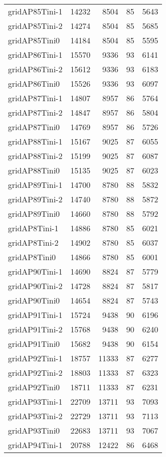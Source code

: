 \begin{longtable}{lrrrr}
gridAP85Tini-1 & 14232 & 8504 & 85 & 5643 \\
gridAP85Tini-2 & 14274 & 8504 & 85 & 5685 \\
gridAP85Tini0 & 14184 & 8504 & 85 & 5595 \\
gridAP86Tini-1 & 15570 & 9336 & 93 & 6141 \\
gridAP86Tini-2 & 15612 & 9336 & 93 & 6183 \\
gridAP86Tini0 & 15526 & 9336 & 93 & 6097 \\
gridAP87Tini-1 & 14807 & 8957 & 86 & 5764 \\
gridAP87Tini-2 & 14847 & 8957 & 86 & 5804 \\
gridAP87Tini0 & 14769 & 8957 & 86 & 5726 \\
gridAP88Tini-1 & 15167 & 9025 & 87 & 6055 \\
gridAP88Tini-2 & 15199 & 9025 & 87 & 6087 \\
gridAP88Tini0 & 15135 & 9025 & 87 & 6023 \\
gridAP89Tini-1 & 14700 & 8780 & 88 & 5832 \\
gridAP89Tini-2 & 14740 & 8780 & 88 & 5872 \\
gridAP89Tini0 & 14660 & 8780 & 88 & 5792 \\
gridAP8Tini-1 & 14886 & 8780 & 85 & 6021 \\
gridAP8Tini-2 & 14902 & 8780 & 85 & 6037 \\
gridAP8Tini0 & 14866 & 8780 & 85 & 6001 \\
gridAP90Tini-1 & 14690 & 8824 & 87 & 5779 \\
gridAP90Tini-2 & 14728 & 8824 & 87 & 5817 \\
gridAP90Tini0 & 14654 & 8824 & 87 & 5743 \\
gridAP91Tini-1 & 15724 & 9438 & 90 & 6196 \\
gridAP91Tini-2 & 15768 & 9438 & 90 & 6240 \\
gridAP91Tini0 & 15682 & 9438 & 90 & 6154 \\
gridAP92Tini-1 & 18757 & 11333 & 87 & 6277 \\
gridAP92Tini-2 & 18803 & 11333 & 87 & 6323 \\
gridAP92Tini0 & 18711 & 11333 & 87 & 6231 \\
gridAP93Tini-1 & 22709 & 13711 & 93 & 7093 \\
gridAP93Tini-2 & 22729 & 13711 & 93 & 7113 \\
gridAP93Tini0 & 22683 & 13711 & 93 & 7067 \\
gridAP94Tini-1 & 20788 & 12422 & 86 & 6468 \\

\end{longtable}
